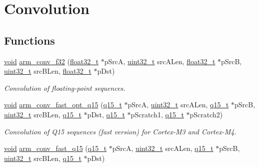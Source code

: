 \hypertarget{group___conv}{\section{Convolution}
\label{group___conv}
}
\subsection*{Functions}
\begin{DoxyCompactItemize}
\item 
\hyperlink{group___n_a_m_e_ga18028b8badbf1ea7e704ccac3c488e82}{void} \hyperlink{group___conv_ga3f860dc98c6fc4cafc421e4a2aed3c89}{arm\-\_\-conv\-\_\-f32} (\hyperlink{arm__math_8h_a4611b605e45ab401f02cab15c5e38715}{float32\-\_\-t} $\ast$p\-Src\-A, \hyperlink{stdint_8h_a435d1572bf3f880d55459d9805097f62}{uint32\-\_\-t} src\-A\-Len, \hyperlink{arm__math_8h_a4611b605e45ab401f02cab15c5e38715}{float32\-\_\-t} $\ast$p\-Src\-B, \hyperlink{stdint_8h_a435d1572bf3f880d55459d9805097f62}{uint32\-\_\-t} src\-B\-Len, \hyperlink{arm__math_8h_a4611b605e45ab401f02cab15c5e38715}{float32\-\_\-t} $\ast$p\-Dst)
\begin{DoxyCompactList}\small\item\em Convolution of floating-\/point sequences. \end{DoxyCompactList}\item 
\hyperlink{group___n_a_m_e_ga18028b8badbf1ea7e704ccac3c488e82}{void} \hyperlink{group___conv_gaf16f490d245391ec18a42adc73d6d749}{arm\-\_\-conv\-\_\-fast\-\_\-opt\-\_\-q15} (\hyperlink{arm__math_8h_ab5a8fb21a5b3b983d5f54f31614052ea}{q15\-\_\-t} $\ast$p\-Src\-A, \hyperlink{stdint_8h_a435d1572bf3f880d55459d9805097f62}{uint32\-\_\-t} src\-A\-Len, \hyperlink{arm__math_8h_ab5a8fb21a5b3b983d5f54f31614052ea}{q15\-\_\-t} $\ast$p\-Src\-B, \hyperlink{stdint_8h_a435d1572bf3f880d55459d9805097f62}{uint32\-\_\-t} src\-B\-Len, \hyperlink{arm__math_8h_ab5a8fb21a5b3b983d5f54f31614052ea}{q15\-\_\-t} $\ast$p\-Dst, \hyperlink{arm__math_8h_ab5a8fb21a5b3b983d5f54f31614052ea}{q15\-\_\-t} $\ast$p\-Scratch1, \hyperlink{arm__math_8h_ab5a8fb21a5b3b983d5f54f31614052ea}{q15\-\_\-t} $\ast$p\-Scratch2)
\begin{DoxyCompactList}\small\item\em Convolution of Q15 sequences (fast version) for Cortex-\/\-M3 and Cortex-\/\-M4. \end{DoxyCompactList}\item 
\hyperlink{group___n_a_m_e_ga18028b8badbf1ea7e704ccac3c488e82}{void} \hyperlink{group___conv_gad75ca978ce906e04abdf86a8d76306d4}{arm\-\_\-conv\-\_\-fast\-\_\-q15} (\hyperlink{arm__math_8h_ab5a8fb21a5b3b983d5f54f31614052ea}{q15\-\_\-t} $\ast$p\-Src\-A, \hyperlink{stdint_8h_a435d1572bf3f880d55459d9805097f62}{uint32\-\_\-t} src\-A\-Len, \hyperlink{arm__math_8h_ab5a8fb21a5b3b983d5f54f31614052ea}{q15\-\_\-t} $\ast$p\-Src\-B, \hyperlink{stdint_8h_a435d1572bf3f880d55459d9805097f62}{uint32\-\_\-t} src\-B\-Len, \hyperlink{arm__math_8h_ab5a8fb21a5b3b983d5f54f31614052ea}{q15\-\_\-t} $\ast$p\-Dst)

\end{DoxyCompactItemize}
